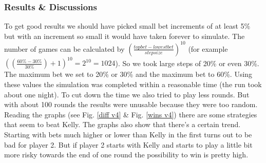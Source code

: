 \documentclass[11pt]{article}
\begin{document}
\subsubsection{Results \& Discussions}
To get good results we should have picked small bet increments of at least 5\% but with an increment so small it would have taken forever to simulate. The number of games can be calculated by $(\frac{top bet-lowest bet}{step size})^{10}$ (for example $((\frac{60\%-30\%}{30\%})+1)^{10}=2^{10}=1024$). So we took large steps of 20\% or even 30\%. The maximum bet we set to 20\% or 30\% and the maximum bet to 60\%. Using these values the simulation was completed within a reasonable time (the run took about one night). To cut down the time we also tried to play less rounds. But with about 100 rounds the results were unusable because they were too random. Reading the graphs (see Fig. \ref{diff v4} \& Fig. \ref{wins v4}) there are some strategies that seem to beat Kelly. The graphs also show that there's a certain trend. Starting with bets much higher or lower than Kelly in the first turns out to be bad for player 2. But if player 2 starts with Kelly and starts to play a little bit more risky towards the end of one round the possibility to win is pretty high.
\end{document}
